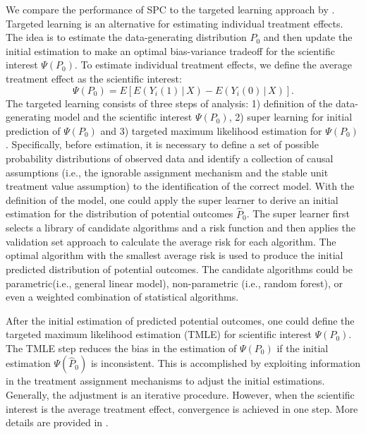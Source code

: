	We compare the performance of SPC to the targeted learning approach by \citet{van2011targeted}. Targeted learning is an alternative for estimating individual treatment effects. The idea is to estimate the data-generating distribution $P_{0}$ and then update the initial estimation to make an optimal bias-variance tradeoff for the scientific interest $\Psi(P_{0})$. To estimate individual treatment effects, we define the average treatment effect as the scientific interest:
	\begin{equation}
		\Psi(P_{0}) = E[E(Y_{i}(1)\,|\,X) - E(Y_{i}(0)\,|\,X)].
	\end{equation} 
	The targeted learning consists of three steps of analysis: 1) definition of the data-generating model and the scientific interest $\Psi(P_{0})$, 2) super learning for initial prediction of $\Psi(P_{0})$ and 3) targeted maximum likelihood estimation for $\Psi(P_{0})$ \citep{van2011targeted}. Specifically, before estimation, it is necessary to define a set of possible probability distributions of observed data and identify a collection of causal assumptions (i.e., the ignorable assignment mechanism and the stable unit treatment value assumption) to the identification of the correct model. With the definition of the model, one could apply the super learner to derive an initial estimation for the distribution of potential outcomes $\hat{P}_0$. The super learner first selects a library of candidate algorithms and a risk function and then applies the validation set approach to calculate the average risk for each algorithm. The optimal algorithm with the smallest average risk is used to produce the initial predicted distribution of potential outcomes. The candidate algorithms could be parametric(i.e., general linear model), non-parametric (i.e., random forest), or even a weighted combination of statistical algorithms. 
	
	After the initial estimation of predicted potential outcomes, one could define the targeted maximum likelihood estimation (TMLE) for scientific interest $\Psi(P_{0})$. The TMLE step reduces the bias in the estimation of $\Psi(P_{0})$ if the initial estimation $\Psi(\hat{P}_0)$ is inconsistent. This is accomplished by exploiting information in the treatment assignment mechanisms to adjust the initial estimations. Generally, the adjustment is an iterative procedure. However, when the scientific interest is the average treatment effect, convergence is achieved in one step. More details are provided in \citet{gruber2011tmle}.    
	
